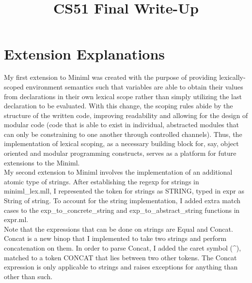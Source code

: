 \documentclass{article}
\title{CS51 Final Write-Up}
\begin{document}
\maketitle

\section{Extension Explanations} 
My first extension to Miniml was created with the purpose of providing lexically-scoped environment semantics such that variables are able to obtain their values from declarations in their own lexical scope rather than simply utilizing the last declaration to be evaluated. With this change, the scoping rules abide by the structure of the written code, improving readability and allowing for the design of modular code (code that is able to exist in individual, abstracted modules that can only be constraining to one another through controlled channels). Thus, the implementation of lexical scoping, as a necessary building block for, say, object oriented and modular programming constructs, serves as a platform for future extensions to the Miniml. \\
My second extension to Miniml involves the implementation of an additional atomic type of strings. After establishing the regexp for strings in miniml{\_}lex.mll, I represented the token for strings as STRING, typed in expr as String of string. To account for the string implementation, I added extra match cases to the exp{\_}to{\_}concrete{\_}string and exp{\_}to{\_}abstract{\_}string functions in expr.ml. \\
Note that the expressions that can be done on strings are Equal and Concat. Concat is a new binop that I implemented to take two strings and perform concatenation on them. In order to parse Concat, I added the caret symbol (\^{}), matched to a token CONCAT that lies between two other tokens. The Concat expression is only applicable to strings and raises exceptions for anything than other than such. 
\end{document}

